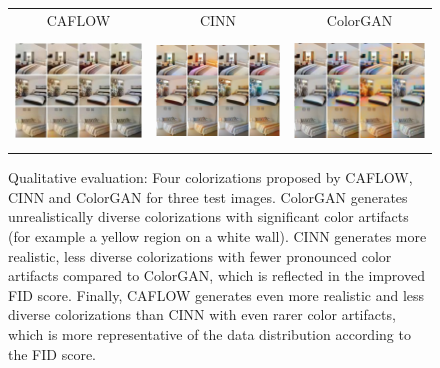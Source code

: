 \begin{figure}[h!]
        \begin{center}
        \setlength{\tabcolsep}{3pt}
        \begin{tabular}{ccc}
        CAFLOW & CINN \cite{ardizzone2019guided} & ColorGAN \cite{colorGAN}  \\
        \includegraphics[height=2.9cm]{Chapter1/paper_graphs/colourisation/CAFLOW_borders.png}&
        \includegraphics[height=2.9cm]{Chapter1/paper_graphs/colourisation/CINN.png}&
        \includegraphics[height=2.9cm]{Chapter1/paper_graphs/colourisation/colorGAN.png}\\
        \end{tabular}
        \caption{Qualitative evaluation: Four colorizations proposed by CAFLOW, CINN and ColorGAN for three test images. ColorGAN generates unrealistically diverse colorizations with significant color artifacts (for example a yellow region on a white wall). CINN generates more realistic, less diverse colorizations with fewer pronounced color artifacts compared to ColorGAN, which is reflected in the improved FID score. Finally, CAFLOW generates even more realistic and less diverse colorizations than CINN with even rarer color artifacts, which is more representative of the data distribution according to the FID score.}
        \label{ch1:fig:colorisation-paper-visuals-results}
        \end{center}
\end{figure}

